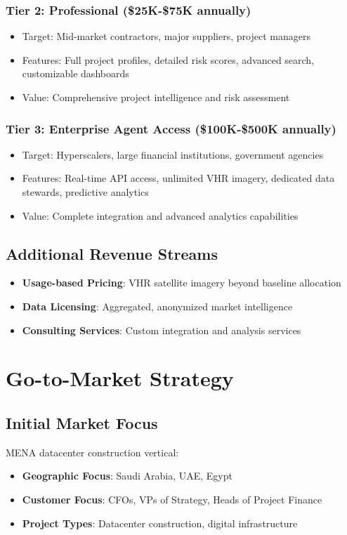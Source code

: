 \documentclass[business]{../templates/infraradar-main}
\begin{document}
\subsubsection{Tier 2: Professional (\$25K-\$75K annually)}
\begin{itemize}
    \item Target: Mid-market contractors, major suppliers, project managers
    \item Features: Full project profiles, detailed risk scores, advanced search, customizable dashboards
    \item Value: Comprehensive project intelligence and risk assessment
\end{itemize}

\subsubsection{Tier 3: Enterprise Agent Access (\$100K-\$500K annually)}
\begin{itemize}
    \item Target: Hyperscalers, large financial institutions, government agencies
    \item Features: Real-time API access, unlimited VHR imagery, dedicated data stewards, predictive analytics
    \item Value: Complete integration and advanced analytics capabilities
\end{itemize}

\subsection{Additional Revenue Streams}
\begin{itemize}
    \item \textbf{Usage-based Pricing}: VHR satellite imagery beyond baseline allocation
    \item \textbf{Data Licensing}: Aggregated, anonymized market intelligence
    \item \textbf{Consulting Services}: Custom integration and analysis services
\end{itemize}

\section{Go-to-Market Strategy}

\subsection{Initial Market Focus}
MENA datacenter construction vertical:
\begin{itemize}
    \item \textbf{Geographic Focus}: Saudi Arabia, UAE, Egypt
    \item \textbf{Customer Focus}: CFOs, VPs of Strategy, Heads of Project Finance
    \item \textbf{Project Types}: Datacenter construction, digital infrastructure
\end{itemize}
\end{document}
